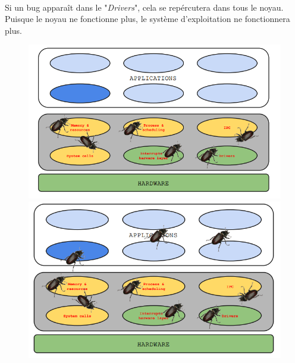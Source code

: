 \paragraph{}
Si un bug apparaît dans le "\textit{Drivers}", cela se repércutera dans tous le noyau. Puisque le noyau ne fonctionne plus, le système d'exploitation ne fonctionnera plus.
\begin{figure}[H]
\includegraphics[scale=0.7]{img_7_4__1}
\includegraphics[scale=0.7]{img_7_4__2}
\end{figure}

